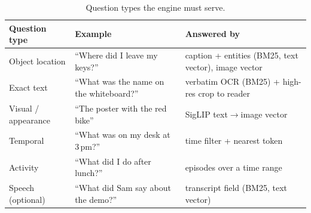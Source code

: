 \documentclass[11pt,a4paper]{article}
\begin{document}
\begin{table}[h]\centering\small
\begin{tabular}{P{3.2cm}P{5.6cm}P{5.2cm}}\toprule
\textbf{Question type} & \textbf{Example} & \textbf{Answered by} \\\midrule
Object location & ``Where did I leave my keys?'' & caption + entities (BM25, text vector), image vector \\
Exact text & ``What was the name on the whiteboard?'' & verbatim OCR (BM25) + high-res crop to reader \\
Visual / appearance & ``The poster with the red bike'' & SigLIP text$\rightarrow$image vector \\
Temporal & ``What was on my desk at 3\,pm?'' & time filter + nearest token \\
Activity & ``What did I do after lunch?'' & episodes over a time range \\
Speech (optional) & ``What did Sam say about the demo?'' & transcript field (BM25, text vector) \\\bottomrule
\end{tabular}
\caption{Question types the engine must serve.}\label{tab:questions}
\end{table}

\end{document}
